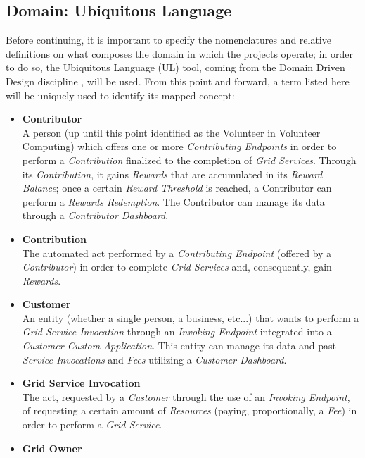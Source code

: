 \subsection{Domain: Ubiquitous Language}
Before continuing, it is important to specify the nomenclatures and relative definitions on what composes the domain in which the projects operate; in order to do so, the Ubiquitous Language (UL) tool, coming from the Domain Driven Design discipline \cite{ddd}, will be used. From this point and forward, a term listed here will be uniquely used to identify its mapped concept:
\begin{itemize}
    \item \textbf{Contributor}\label{contributor}\\
    A person (up until this point identified as the Volunteer in Volunteer Computing) which offers one or more \textit{Contributing Endpoints} in order to perform a \textit{Contribution} finalized to the completion of \textit{Grid Services}. Through its \textit{Contribution}, it gains \textit{Rewards} that are accumulated in its \textit{Reward Balance}; once a certain \textit{Reward Threshold} is reached, a Contributor can perform a \textit{Rewards Redemption}. The Contributor can manage its data through a \textit{Contributor Dashboard}.
    \item \textbf{Contribution}\label{contribution}\\
    The automated act performed by a \textit{Contributing Endpoint} (offered by a \textit{Contributor}) in order to complete \textit{Grid Services} and, consequently, gain \textit{Rewards}.
    \item \textbf{Customer}\label{customer}\\
    An entity (whether a single person, a business, etc...) that wants to perform a \textit{Grid Service Invocation} through an \textit{Invoking Endpoint} integrated into a \textit{Customer Custom Application}. This entity can manage its data and past \textit{Service Invocations} and \textit{Fees} utilizing a \textit{Customer Dashboard}.
    \item \textbf{Grid Service Invocation}\label{grid_service_invocation}\\
    The act, requested by a \textit{Customer} through the use of an \textit{Invoking Endpoint}, of requesting a certain amount of \textit{Resources} (paying, proportionally, a \textit{Fee}) in order to perform a \textit{Grid Service}.
    \item \textbf{Grid Owner}\label{grid_owner}\\

\end{itemize}
